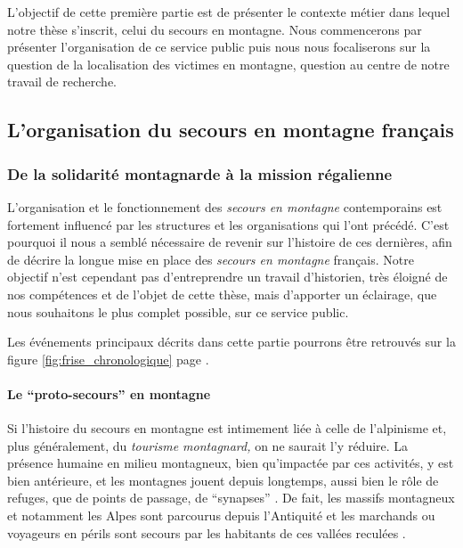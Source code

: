 L'objectif de cette première partie est de présenter le contexte
métier dans lequel notre thèse s'inscrit, celui du secours en
montagne. Nous commencerons par présenter l'organisation de ce service
public puis nous nous focaliserons sur la question de la localisation
des victimes en montagne, question au centre de notre travail de
recherche.

\subsection{L’organisation du secours en montagne français}
\label{subsec:1-1-1}

\subsubsection{De la solidarité montagnarde à la mission régalienne}
\label{subsubsec:1-1-1-1}

L'organisation et le fonctionnement des \emph{secours en montagne}
contemporains est fortement influencé par les structures et les
organisations qui l'ont précédé. C'est pourquoi il nous a semblé
nécessaire de revenir sur l'histoire de ces dernières, afin de décrire
la longue mise en place des \emph{secours en montagne} français. Notre
objectif n'est cependant pas d'entreprendre un travail d'historien,
très éloigné de nos compétences et de l'objet de cette thèse, mais
d'apporter un éclairage, que nous souhaitons le plus complet possible,
sur ce service public.

Les événements principaux décrits dans cette partie pourrons être
retrouvés sur la figure \ref{fig:frise_chronologique} page
\pageref{fig:frise_chronologique}.

\paragraph{Le \enquote{proto-secours} en montagne}
\label{par:1-1-1-1-1}

Si l'histoire du secours en montagne est intimement liée à celle de
l'alpinisme et, plus généralement, du \emph{tourisme montagnard,} on
ne saurait l'y réduire. La présence humaine en milieu montagneux, bien
qu'impactée par ces activités, y est bien antérieure, et les montagnes
jouent depuis longtemps, aussi bien le rôle de refuges, que de points
de passage, de \enquote{synapses} \autocite[p. 337]{Brunet1992}. De
fait, les massifs montagneux et notamment les Alpes sont parcourus
depuis l'Antiquité et les marchands ou voyageurs en périls sont
secours par les habitants de ces vallées reculées
\autocite{Mezin2016}.

